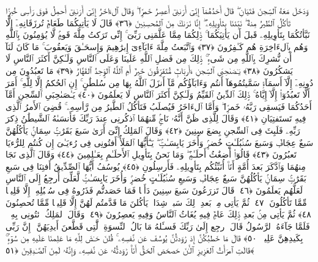  وَدَخَلَ مَعَهُ ٱلسِّجنَ فَتَيَانِ ۖ قَالَ أَحَدُهُمَآ إِنِّىٓ أَرَىٰنِىٓ أَعصِرُ خَمرًۭا ۖ وَقَالَ ٱلءَاخَرُ إِنِّىٓ أَرَىٰنِىٓ أَحمِلُ فَوقَ رَأسِى خُبزًۭا تَأكُلُ ٱلطَّيرُ مِنهُ ۖ نَبِّئنَا بِتَأوِيلِهِۦٓ ۖ إِنَّا نَرَىٰكَ مِنَ ٱلمُحسِنِينَ ﴿٣٦﴾
 قَالَ لَا يَأتِيكُمَا طَعَامٌۭ تُرزَقَانِهِۦٓ إِلَّا نَبَّأتُكُمَا بِتَأوِيلِهِۦ قَبلَ أَن يَأتِيَكُمَا ۚ ذَٟلِكُمَا مِمَّا عَلَّمَنِى رَبِّىٓ ۚ إِنِّى تَرَكتُ مِلَّةَ قَومٍۢ لَّا يُؤمِنُونَ بِٱللَّهِ وَهُم بِٱلءَاخِرَةِ هُم كَـٰفِرُونَ ﴿٣٧﴾
 وَٱتَّبَعتُ مِلَّةَ ءَابَآءِىٓ إِبرَٰهِيمَ وَإِسحَـٰقَ وَيَعقُوبَ ۚ مَا كَانَ لَنَآ أَن نُّشرِكَ بِٱللَّهِ مِن شَىءٍۢ ۚ ذَٟلِكَ مِن فَضلِ ٱللَّهِ عَلَينَا وَعَلَى ٱلنَّاسِ وَلَـٰكِنَّ أَكثَرَ ٱلنَّاسِ لَا يَشكُرُونَ ﴿٣٨﴾
 يَـٰصَىٰحِبَىِ ٱلسِّجنِ ءَأَربَابٌۭ مُّتَفَرِّقُونَ خَيرٌ أَمِ ٱللَّهُ ٱلوَٟحِدُ ٱلقَهَّارُ ﴿٣٩﴾
 مَا تَعبُدُونَ مِن دُونِهِۦٓ إِلَّآ أَسمَآءًۭ سَمَّيتُمُوهَآ أَنتُم وَءَابَآؤُكُم مَّآ أَنزَلَ ٱللَّهُ بِهَا مِن سُلطَٰنٍ ۚ إِنِ ٱلحُكمُ إِلَّا لِلَّهِ ۚ أَمَرَ أَلَّا تَعبُدُوٓا۟ إِلَّآ إِيَّاهُ ۚ ذَٟلِكَ ٱلدِّينُ ٱلقَيِّمُ وَلَـٰكِنَّ أَكثَرَ ٱلنَّاسِ لَا يَعلَمُونَ ﴿٤٠﴾
 يَـٰصَىٰحِبَىِ ٱلسِّجنِ أَمَّآ أَحَدُكُمَا فَيَسقِى رَبَّهُۥ خَمرًۭا ۖ وَأَمَّا ٱلءَاخَرُ فَيُصلَبُ فَتَأكُلُ ٱلطَّيرُ مِن رَّأسِهِۦ ۚ قُضِىَ ٱلأَمرُ ٱلَّذِى فِيهِ تَستَفتِيَانِ ﴿٤١﴾
 وَقَالَ لِلَّذِى ظَنَّ أَنَّهُۥ نَاجٍۢ مِّنهُمَا ٱذكُرنِى عِندَ رَبِّكَ فَأَنسَىٰهُ ٱلشَّيطَٰنُ ذِكرَ رَبِّهِۦ فَلَبِثَ فِى ٱلسِّجنِ بِضعَ سِنِينَ ﴿٤٢﴾
 وَقَالَ ٱلمَلِكُ إِنِّىٓ أَرَىٰ سَبعَ بَقَرَٰتٍۢ سِمَانٍۢ يَأكُلُهُنَّ سَبعٌ عِجَافٌۭ وَسَبعَ سُنۢبُلَـٰتٍ خُضرٍۢ وَأُخَرَ يَابِسَـٰتٍۢ ۖ يَـٰٓأَيُّهَا ٱلمَلَأُ أَفتُونِى فِى رُءيَـٰىَ إِن كُنتُم لِلرُّءيَا تَعبُرُونَ ﴿٤٣﴾
 قَالُوٓا۟ أَضغَٰثُ أَحلَـٰمٍۢ ۖ وَمَا نَحنُ بِتَأوِيلِ ٱلأَحلَـٰمِ بِعَـٰلِمِينَ ﴿٤٤﴾
 وَقَالَ ٱلَّذِى نَجَا مِنهُمَا وَٱدَّكَرَ بَعدَ أُمَّةٍ أَنَا۠ أُنَبِّئُكُم بِتَأوِيلِهِۦ فَأَرسِلُونِ ﴿٤٥﴾
 يُوسُفُ أَيُّهَا ٱلصِّدِّيقُ أَفتِنَا فِى سَبعِ بَقَرَٰتٍۢ سِمَانٍۢ يَأكُلُهُنَّ سَبعٌ عِجَافٌۭ وَسَبعِ سُنۢبُلَـٰتٍ خُضرٍۢ وَأُخَرَ يَابِسَـٰتٍۢ لَّعَلِّىٓ أَرجِعُ إِلَى ٱلنَّاسِ لَعَلَّهُم يَعلَمُونَ ﴿٤٦﴾
 قَالَ تَزرَعُونَ سَبعَ سِنِينَ دَأَبًۭا فَمَا حَصَدتُّم فَذَرُوهُ فِى سُنۢبُلِهِۦٓ إِلَّا قَلِيلًۭا مِّمَّا تَأكُلُونَ ﴿٤٧﴾
 ثُمَّ يَأتِى مِنۢ بَعدِ ذَٟلِكَ سَبعٌۭ شِدَادٌۭ يَأكُلنَ مَا قَدَّمتُم لَهُنَّ إِلَّا قَلِيلًۭا مِّمَّا تُحصِنُونَ ﴿٤٨﴾
 ثُمَّ يَأتِى مِنۢ بَعدِ ذَٟلِكَ عَامٌۭ فِيهِ يُغَاثُ ٱلنَّاسُ وَفِيهِ يَعصِرُونَ ﴿٤٩﴾
 وَقَالَ ٱلمَلِكُ ٱئتُونِى بِهِۦ ۖ فَلَمَّا جَآءَهُ ٱلرَّسُولُ قَالَ ٱرجِع إِلَىٰ رَبِّكَ فَسـَٔلهُ مَا بَالُ ٱلنِّسوَةِ ٱلَّٰتِى قَطَّعنَ أَيدِيَهُنَّ ۚ إِنَّ رَبِّى بِكَيدِهِنَّ عَلِيمٌۭ ﴿٥٠﴾
 قَالَ مَا خَطبُكُنَّ إِذ رَٰوَدتُّنَّ يُوسُفَ عَن نَّفسِهِۦ ۚ قُلنَ حَـٰشَ لِلَّهِ مَا عَلِمنَا عَلَيهِ مِن سُوٓءٍۢ ۚ قَالَتِ ٱمرَأَتُ ٱلعَزِيزِ ٱلـَٰٔنَ حَصحَصَ ٱلحَقُّ أَنَا۠ رَٰوَدتُّهُۥ عَن نَّفسِهِۦ وَإِنَّهُۥ لَمِنَ ٱلصَّـٰدِقِينَ ﴿٥١﴾
